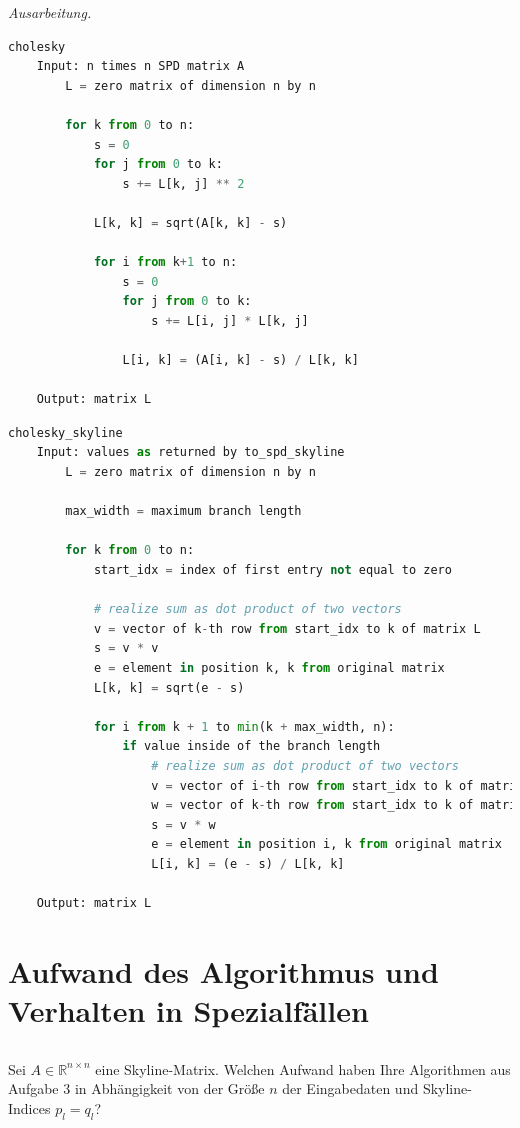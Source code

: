 \documentclass[titlepage]{article}
\newenvironment{ausarbeitung}{\vspace{3mm}\noindent\textit{Ausarbeitung.}}{}
\begin{document}
\begin{ausarbeitung}
	\begin{lstlisting}[language=Python, caption=Algorithmus für die Cholesky Zerlegung einer Matrix aus der Vorlesung]
	cholesky
	Input: n times n SPD matrix A	
		L = zero matrix of dimension n by n

		for k from 0 to n:
			s = 0
			for j from 0 to k:
				s += L[k, j] ** 2

			L[k, k] = sqrt(A[k, k] - s)

			for i from k+1 to n:
				s = 0
				for j from 0 to k:
					s += L[i, j] * L[k, j]

				L[i, k] = (A[i, k] - s) / L[k, k]

	Output: matrix L\end{lstlisting}
	
	\begin{lstlisting}[language=Python, caption=Optimierter Algorithmus für die Cholesky Zerlegung einer Skyline-Matrix]
	cholesky_skyline
	Input: values as returned by to_spd_skyline
		L = zero matrix of dimension n by n

		max_width = maximum branch length

		for k from 0 to n:
			start_idx = index of first entry not equal to zero
			
			# realize sum as dot product of two vectors
			v = vector of k-th row from start_idx to k of matrix L
			s = v * v
			e = element in position k, k from original matrix
			L[k, k] = sqrt(e - s)

			for i from k + 1 to min(k + max_width, n):
				if value inside of the branch length
					# realize sum as dot product of two vectors
					v = vector of i-th row from start_idx to k of matrix L
					w = vector of k-th row from start_idx to k of matrix L
					s = v * w
					e = element in position i, k from original matrix
					L[i, k] = (e - s) / L[k, k]

	Output: matrix L\end{lstlisting}
\end{ausarbeitung}
\newpage



\section{Aufwand des Algorithmus und Verhalten in Spezialfällen}


\subsection{}
Sei $A \in \mathbb{R}^{n\times n}$ eine Skyline-Matrix. Welchen Aufwand haben Ihre Algorithmen aus Aufgabe 3 in Abhängigkeit von der Größe $n$ der Eingabedaten und Skyline-Indices $p_l = q_l$?
\end{document}
